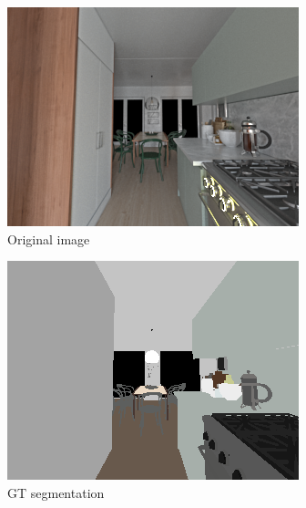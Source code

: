 \begin{figure}[H]
  \centering
  \begin{subfigure}{0.32\linewidth}
    \includegraphics[width=\linewidth]{praca/images/AI45_007_Cam09.png}
    \caption{Original image}
  \end{subfigure}
  \begin{subfigure}{0.32\linewidth}
    \includegraphics[width=\linewidth]{praca/images/AI45_007_Cam09.segmentation.png}
    \caption{GT segmentation}
  \end{subfigure}
  \begin{subfigure}{0.32\linewidth}

\end{subfigure}
\end{figure}
